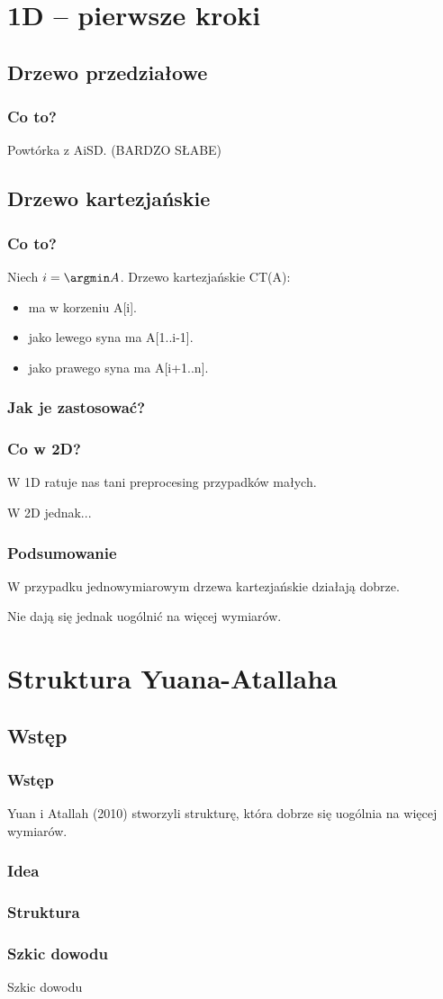 \documentclass{beamer}
\begin{document}
\section{1D -- pierwsze kroki}
\subsection{Drzewo przedziałowe}
\begin{frame} \frametitle{Co to?}
 Powtórka z AiSD.
 \pause (BARDZO SŁABE)
\end{frame}

\subsection{Drzewo kartezjańskie}
\begin{frame} \frametitle{Co to?}
 Niech $i = \argmin A$. Drzewo kartezjańskie CT(A):
 \begin{itemize}
  \item ma w korzeniu A[i].
  \item jako lewego syna ma A[1..i-1].
  \item jako prawego syna ma A[i+1..n].
 \end{itemize}
\end{frame}

\begin{frame} \frametitle{Jak je zastosować?}
 
\end{frame}

\begin{frame} \frametitle{Co w 2D?}
 W 1D ratuje nas tani preprocesing przypadków małych.
 
 W 2D jednak...
\end{frame}

\begin{frame} \frametitle{Podsumowanie}
 W przypadku jednowymiarowym drzewa kartezjańskie działają dobrze.
 
 Nie dają się jednak uogólnić na więcej wymiarów.
\end{frame}

\section{Struktura Yuana-Atallaha}

\subsection{Wstęp}
\begin{frame} \frametitle{Wstęp}
 Yuan i Atallah (2010) stworzyli strukturę, która dobrze się uogólnia na więcej wymiarów.
\end{frame}

\begin{frame} \frametitle{Idea}
 
\end{frame}

\begin{frame} \frametitle{Struktura}
 
\end{frame}

\begin{frame} \frametitle{Szkic dowodu}
 Szkic dowodu
\end{frame}
\end{document}
